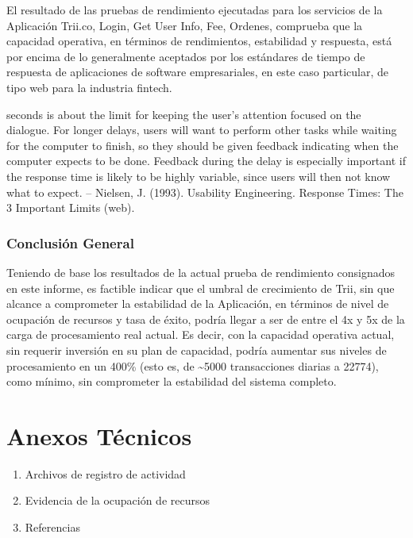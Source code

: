 \documentclass[
  paper=a4,
  ,captions=tableheading
]{scrartcl}
\providecommand{\tightlist}{%
  \setlength{\itemsep}{0pt}\setlength{\parskip}{0pt}}
\renewenvironment{quote}{\begin{customblockquote}\list{}{\rightmargin=0em\leftmargin=0em}%
\item\relax\color{blockquote-text}\ignorespaces}{\unskip\unskip\endlist\end{customblockquote}}
\begin{document}
El resultado de las pruebas de rendimiento ejecutadas para los servicios
de la Aplicación Trii.co, Login, Get User Info, Fee, Ordenes, comprueba
que la capacidad operativa, en términos de rendimientos, estabilidad y
respuesta, está por encima de lo generalmente aceptados por los
estándares de tiempo de respuesta de aplicaciones de software
empresariales, en este caso particular, de tipo web para la industria
fintech.

\begin{quote}
10 seconds is about the limit for keeping the user's attention focused
on the dialogue. For longer delays, users will want to perform other
tasks while waiting for the computer to finish, so they should be given
feedback indicating when the computer expects to be done. Feedback
during the delay is especially important if the response time is likely
to be highly variable, since users will then not know what to expect. --
Nielsen, J. (1993). Usability Engineering. Response Times: The 3
Important Limits (web).
\end{quote}

\subsubsection{Conclusión General}\label{sec:conclusiuxf3n-general}

Teniendo de base los resultados de la actual prueba de rendimiento
consignados en este informe, es factible indicar que el umbral de
crecimiento de Trii, sin que alcance a comprometer la estabilidad de la
Aplicación, en términos de nivel de ocupación de recursos y tasa de
éxito, podría llegar a ser de entre el 4x y 5x de la carga de
procesamiento real actual. Es decir, con la capacidad operativa actual,
sin requerir inversión en su plan de capacidad, podría aumentar sus
niveles de procesamiento en un 400\% (esto es, de \textasciitilde5000
transacciones diarias a 22774), como mínimo, sin comprometer la
estabilidad del sistema completo.

\newpage

\section{Anexos Técnicos}\label{sec:anexos-tuxe9cnicos}

\begin{enumerate}
\def\labelenumi{\arabic{enumi}.}
\tightlist
\item
  Archivos de registro de actividad
\item
  Evidencia de la ocupación de recursos
\item
  Referencias
\end{enumerate}
\end{document}
